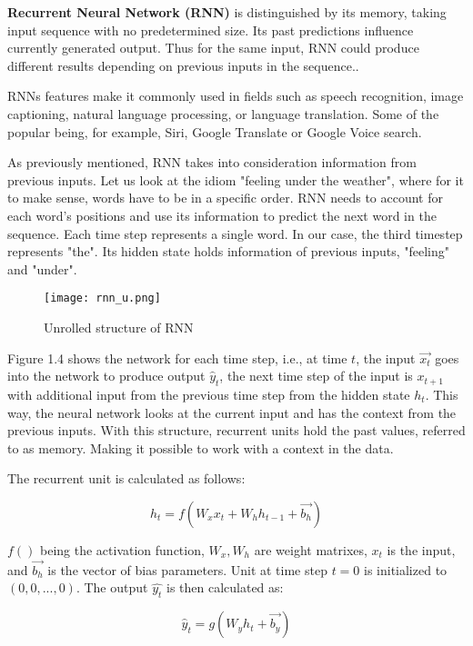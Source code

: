 \textbf{Recurrent Neural Network (RNN)} is distinguished by its memory, taking input sequence with no predetermined size. Its past predictions influence currently generated output. Thus for the same input, RNN could produce different results depending on previous inputs in the sequence.\cite{rnnDSmedium}.

RNNs features make it commonly used in fields such as speech recognition, image captioning, natural language processing, or language translation. Some of the popular being, for example, Siri, Google Translate or Google Voice search.\cite{ibmrnn}

As previously mentioned, RNN takes into consideration information from previous inputs. Let us look at the idiom "feeling under the weather", where for it to make sense, words have to be in a specific order. RNN needs to account for each word's positions and use its information to predict the next word in the sequence. Each time step represents a single word. In our case, the third timestep represents "the". Its hidden state holds information of previous inputs, "feeling" and "under".\cite{ibmrnn}

\begin{figure}[h]
	\centering
    \texttt{[image: rnn\_u.png]}
	\caption{Unrolled structure of RNN \cite{matous}}
	\label{fig:rnn}
\end{figure}


Figure 1.4 shows the network for each time step, i.e., at time $t$, the input $\vec{x_t}$ goes into the network to produce output $\hat{y}_t$, the next time step of the input is $x_{t+1}$ with additional input from the previous time step from the hidden state $h_{t}$. This way, the neural network looks at the current input and has the context from the previous inputs.
With this structure, recurrent units hold the past values, referred to as memory. Making it possible to work with a context in the data.
\cite{rnnin6}

The recurrent unit is calculated as follows:

\begin{equation}
    {h_t = f(W_{x}x_t + W_{h}h_{t-1}+\vec{b_h})}
\end{equation}

$f()$ being the activation function, $W_x,W_h$ are weight matrixes, $x_t$ is the input, and $\vec{b_h}$ is the vector of bias parameters. Unit at time step $t=0$ is initialized to $(0,0,...,0)$. The output $\hat{y_t}$ is then calculated as:

\begin{equation}
    {\hat{y}_t = g(W_{y}h_t + \vec{b_y})}
\end{equation}


